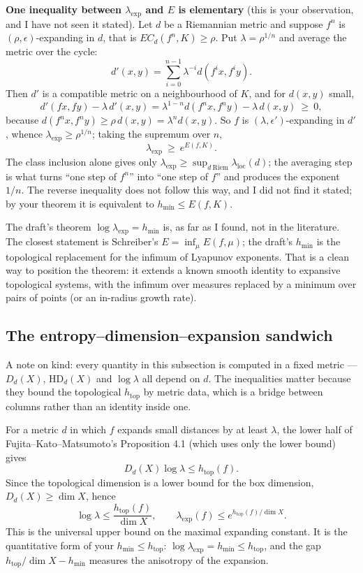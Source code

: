 \documentclass[
]{article}
\begin{document}
\textbf{One inequality between \(\lambda_{\exp}\) and \(E\) is
elementary} (this is your observation, and I have not seen it stated).
Let \(d\) be a Riemannian metric and suppose \(f^n\) is
\((\rho,\epsilon)\)-expanding in \(d\), that is \(EC_d(f^n,K)\ge\rho\).
Put \(\lambda=\rho^{1/n}\) and average the metric over the cycle: \[
d'(x,y)=\sum_{i=0}^{n-1}\lambda^{-i}d(f^ix,f^iy).
\] Then \(d'\) is a compatible metric on a neighbourhood of \(K\), and
for \(d(x,y)\) small, \[
d'(fx,fy)-\lambda\,d'(x,y)=\lambda^{1-n}d(f^nx,f^ny)-\lambda\,d(x,y)\ \ge\ 0,
\] because \(d(f^nx,f^ny)\ge\rho\,d(x,y)=\lambda^n d(x,y)\). So \(f\) is
\((\lambda,\epsilon')\)-expanding in \(d'\), whence
\(\lambda_{\exp}\ge\rho^{1/n}\); taking the supremum over \(n\), \[
\lambda_{\exp}\ \ge\ e^{E(f,K)}.
\] The class inclusion alone gives only
\(\lambda_{\exp}\ge\sup_{d\ \mathrm{Riem}}\lambda_{\mathrm{loc}}(d)\);
the averaging step is what turns ``one step of \(f^n\)'' into ``one step
of \(f\)'' and produces the exponent \(1/n\). The reverse inequality
does not follow this way, and I did not find it stated; by your theorem
it is equivalent to \(h_{\min}\le E(f,K)\).

The draft's theorem \(\log\lambda_{\exp}=h_{\min}\) is, as far as I
found, not in the literature. The closest statement is Schreiber's
\(E=\inf_\mu E(f,\mu)\); the draft's \(h_{\min}\) is the topological
replacement for the infimum of Lyapunov exponents. That is a clean way
to position the theorem: it extends a known smooth identity to expansive
topological systems, with the infimum over measures replaced by a
minimum over pairs of points (or an in-radius growth rate).

\subsection{The entropy--dimension--expansion
sandwich}\label{the-entropydimensionexpansion-sandwich}

A note on kind: every quantity in this subsection is computed in a fixed
metric --- \(D_d(X)\), \(\mathrm{HD}_d(X)\) and \(\log\lambda\) all
depend on \(d\). The inequalities matter because they bound the
topological \(h_{\mathrm{top}}\) by metric data, which is a bridge
between columns rather than an identity inside one.

For a metric \(d\) in which \(f\) expands small distances by at least
\(\lambda\), the lower half of Fujita--Kato--Matsumoto's Proposition 4.1
(which uses only the lower bound) gives \[
D_d(X)\log\lambda\le h_{\mathrm{top}}(f).
\] Since the topological dimension is a lower bound for the box
dimension, \(D_d(X)\ge\dim X\), hence \[
\log\lambda\le\frac{h_{\mathrm{top}}(f)}{\dim X},\qquad
\lambda_{\exp}(f)\le e^{h_{\mathrm{top}}(f)/\dim X}.
\] This is the universal upper bound on the maximal expanding constant.
It is the quantitative form of your \(h_{\min}\le h_{\mathrm{top}}\):
\(\log\lambda_{\exp}=h_{\min}\le h_{\mathrm{top}}\), and the gap
\(h_{\mathrm{top}}/\dim X-h_{\min}\) measures the anisotropy of the
expansion.
\end{document}
